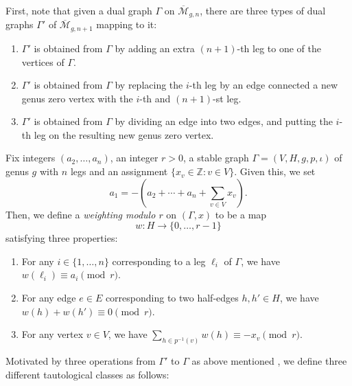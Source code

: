 \documentclass[12pt,reqno]{amsart}
\theoremstyle{plain}
\theoremstyle{definition}
\theoremstyle{remark}
\newcommand{\Xin}[1]{{\color{magenta}{\texttt Xin: #1}}}
\begin{document}
First, note that given a dual graph $\Gamma$ on
$\overline{\mathcal{M}}_{g,n}$, there are three types of dual graphs
$\Gamma'$ of $\overline{\mathcal{M}}_{g,n + 1}$ mapping to it:
\begin{enumerate}
\item $\Gamma'$ is obtained from $\Gamma$ by adding an extra $(n+1)$-th  leg to
  one of the vertices of $\Gamma$.
\item $\Gamma'$ is obtained from $\Gamma$ by replacing the $i$-th leg
  by an edge connected a new genus zero vertex with the $i$-th and
  $(n+1)$-st leg.
\item $\Gamma'$ is obtained from $\Gamma$ by dividing an edge into two
  edges, and putting the $i$-th leg on the resulting new genus zero
  vertex.
\end{enumerate}
Fix integers $(a_2, \dotsc, a_n)$, an integer $r > 0$,  a
stable graph $\Gamma=(V,H,g,p,\iota)$ of genus $g$ with $n$ legs and 
an  assignment $\{x_v \in \mathbb Z: v \in V\}$.
Given this, we set
\begin{equation*}
  a_1 = -(a_2 + \dotsb + a_n + \sum_{v \in V} x_v).
\end{equation*}
Then, we define a \emph{weighting modulo $r$} on $(\Gamma, x)$ to be a
map
\begin{equation*}
  w\colon H \to \{0, \dotsc, r - 1\}
\end{equation*}
satisfying three properties:
\begin{enumerate}
\item For any $i \in \{1, \dotsc, n\}$ corresponding to a leg $\ell_i$
  of $\Gamma$, we have $w(\ell_i) \equiv a_i \pmod{r}$.
\item For any edge $e\in E$ corresponding to two half-edges $h, h'\in H$, we
  have $w(h) + w(h') \equiv 0 \pmod{r}$.
\item For any vertex $v \in V$, we have
  $\sum_{h\in p^{-1}(v)} w(h) \equiv -x_v \pmod{r}$.
\end{enumerate}
Motivated by three operations from $\Gamma'$ to $\Gamma$ as above mentioned , we define
three different tautological classes as follows: 
\end{document}
